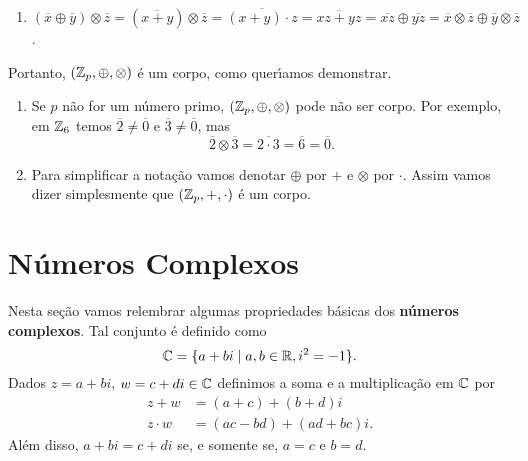 \begin{prova}
\begin{enumerate}[label={\roman*})]
\begin{align*}
			&\overline{x} \otimes \overline{y} + \overline{p} \otimes \overline{z} = \overline{1}\\
			&\overline{x} \otimes \overline{y} = \overline{1}
		\end{align*}
		uma vez que $\overline{p} = \overline{0}$. Como $\overline{y}$ \'e obtido pelo resto da divis\~ao inteira de $y$ por $p$, ent\~ao
		$\overline{y} \in \z_p$. Observe que $y \ne 0$ pois $p \ge 2$ e $y \ne p$ pois sen\~ao $(x + z)p = 1$ o que \'e imposs{\'\i}vel uma vez que $p \ge 2$. Logo $\overline{y} \ne \overline{0}$ e assim todo elemento $\overline{x} \in \z_p$ possui inverso multiplicativo.
		\item $(\overline{x} \oplus \overline{y}) \otimes \overline{z}= (\overline{x + y}) \otimes \overline{z} = \overline{(x + y) \cdot z} = \overline{xz + yz} = \overline{xz} \oplus \overline{yz} = \overline{x} \otimes \overline{z} \oplus \overline{y} \otimes \overline{z}$.
	\end{enumerate}
	Portanto, $(\mathbb{Z}_p, \oplus, \otimes)$ \'e um corpo, como quer{\'\i}amos demonstrar.
\end{prova}

\begin{observacao}
\begin{enumerate}
	\item Se $p$ n\~ao for um n\'umero primo, $(\mathbb{Z}_p, \oplus, \otimes)$ pode n\~ao ser corpo. Por exemplo, em $\mathbb{Z}_6$ temos $\overline{2} \ne \overline{0}$ e $\overline{3} \ne \overline{0}$, mas
	\[
		\overline{2}\otimes \overline{3} = \overline{2\cdot 3} = \overline{6} = \overline{0}.
	\]
	\item Para simplificar a nota\c{c}\~ao vamos denotar $\oplus$ por $+$ e $\otimes$ por $\cdot$. Assim vamos dizer simplesmente que $(\mathbb{Z}_p, +, \cdot)$ \'e um corpo.
\end{enumerate}
\end{observacao}

\section{N\'umeros Complexos}
Nesta se\c{c}\~ao vamos relembrar algumas propriedades b\'asicas dos \textbf{n\'umeros complexos}. Tal conjunto \'e definido como
\[
	\mathbb{C} = \{a + bi \mid a, b \in \mathbb{R}, i^2 = -1\}.
\]
Dados $z = a + bi$, $w = c + di \in \mathbb{C}$ definimos a soma e a multiplica\c{c}\~ao em $\mathbb{C}$ por
\begin{align*}
	z + w &= (a + c) + (b + d)i\\
	z\cdot w &= (ac - bd) + (ad + bc)i.
\end{align*}
Al\'em disso, $a + bi = c + di$ se, e somente se, $a = c$ e $b = d$.

